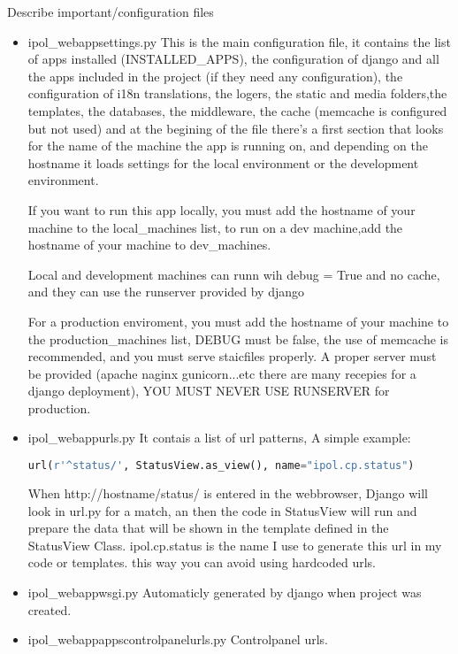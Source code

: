 Describe important/configuration files

\begin{itemize}
\item  ipol\_webapp\/settings.py
This is the main configuration file, it contains the list of apps installed (INSTALLED\_APPS), the configuration of django and all the apps included in the project (if they need any configuration), the configuration of i18n translations, the logers, the static and media folders,the templates, the databases, the middleware, the cache (memcache is configured but not used) and at the begining of the file there's a first section that looks for the name of the machine the app is running on, and depending on the hostname it loads settings for the local environment or the development environment.

If you want to run this app locally, you must add the hostname of your machine to the local\_machines list, 
to run on a dev machine,add the hostname of your machine to dev\_machines.

Local and development machines can runn wih debug = True and no cache, and they can use the runserver provided by django

For a production enviroment, you must add the hostname of your machine to the production\_machines list,  DEBUG must be false, the use of memcache is recommended, and you must serve staicfiles properly. A proper server must be provided (apache naginx gunicorn...etc there are many recepies for a django deployment), YOU MUST NEVER USE RUNSERVER for production.
 

\item  ipol\_webapp\/urls.py
It contais a list of url patterns, 
A simple example:
\begin{lstlisting}[language=Python,firstnumber=1]
url(r'^status/', StatusView.as_view(), name="ipol.cp.status")
\end{lstlisting}
When http://hostname/status/ is entered in the webbrowser, Django will look in url.py for a match, an then the code in StatusView will run and prepare the data that will be shown in the template defined in the StatusView Class.
ipol.cp.status is the name I use to generate this url in my code or templates. this way you can avoid using hardcoded urls.

\item  ipol\_webapp\/wsgi.py
Automaticly generated by django when project was created.

\item  ipol\_webapp\/apps\/controlpanel\/urls.py
Controlpanel urls.


\end{itemize}
